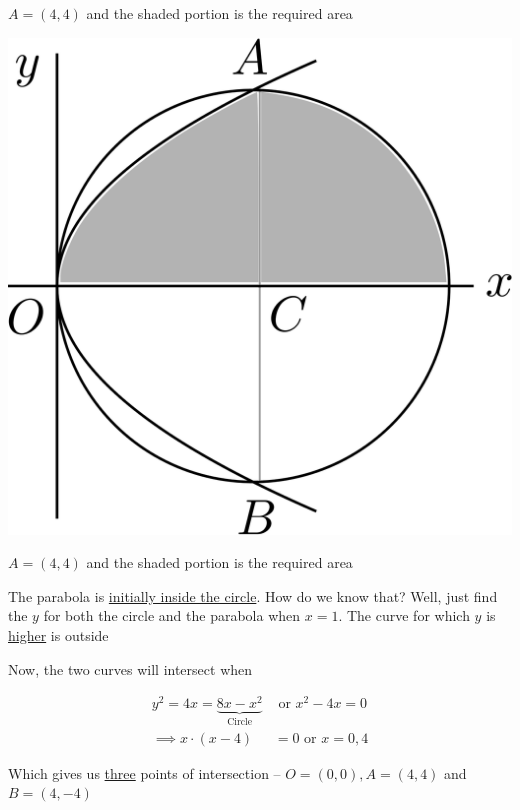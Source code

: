 \documentclass[14pt,fleqn]{extarticle}
\begin{document}
\begin{problem}
\begin{step}
\begin{options}
$A = \left(4,4 \right)$ and the shaded portion is the required area 
     \incorrect
        
        \begin{center}
\includegraphics[scale=0.2]{1381-D.svg}
\end{center}

$A = \left(4,4 \right)$ and the shaded portion is the required area 
    \end{options} 
     \reason 
     
     The parabola is \underline{initially inside the circle}. How do we know 
     that? Well, just find the $y$ for both the circle and the parabola 
     when $x=1$. The curve for which $y$ is \underline{higher} is outside\newline 
     
     Now, the two curves will intersect when 
     
     \begin{align}
     y^2 = 4x = \underbrace{8x-x^2}_{\text{Circle}}&\text{ or } x^2 - 4x = 0  \\
     \implies x\cdot \left(x-4 \right) &= 0\text{ or } x = 0,4 
\end{align}

Which gives us \underline{three} points of intersection -- $O = (0,0), A = (4,4)$ and $B=(4,-4)$ \newline 


\end{step}
\end{problem}
\end{document}
